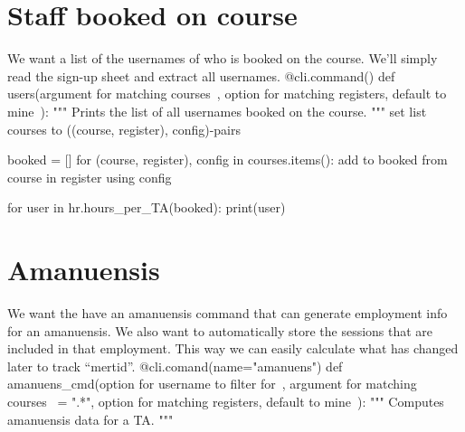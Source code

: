 \section{Staff booked on course}

We want a list of the usernames of who is booked on the course.
We'll simply read the sign-up sheet and extract all usernames.
\nwenddocs{}\plusendmoddef\nwstartdeflinemarkup{}\nwenddeflinemarkup
@cli.command()
def users(\LA{}argument for matching courses~{\nwtagstyle{}}\RA{},
          \LA{}option for matching registers, default to mine~{\nwtagstyle{}}\RA{}):
  """
  Prints the list of all usernames booked on the course.
  """
  \LA{}set list \code{}courses\edoc{} to ((course, register), config)-pairs~{\nwtagstyle{}}\RA{}

  booked = []
  for (course, register), config in courses.items():
    \LA{}add to \code{}booked\edoc{} from \code{}course\edoc{} in \code{}register\edoc{} using \code{}config\edoc{}~{\nwtagstyle{}}\RA{}

  for user in hr.hours_per_TA(booked):
    print(user)
\nwendcode{}\nwdocspar


\section{Amanuensis}

We want the have an amanuensis command that can generate employment info for an 
amanuensis.
We also want to automatically store the sessions that are included in that 
employment.
This way we can easily calculate what has changed later to track 
\enquote{\foreignlanguage{swedish}{mertid}}.
\nwenddocs{}\plusendmoddef\nwstartdeflinemarkup{}\nwenddeflinemarkup
{}\nwendcode{}\endmoddef\nwstartdeflinemarkup\nwenddeflinemarkup
@cli.comand(name="amanuens")
def amanuens_cmd(\LA{}option for username to filter for~{\nwtagstyle{}}\RA{},
                 \LA{}argument for matching courses~{\nwtagstyle{}}\RA{} = ".*",
                 \LA{}option for matching registers, default to mine~{\nwtagstyle{}}\RA{}):
  """
  Computes amanuensis data for a TA.
  """

